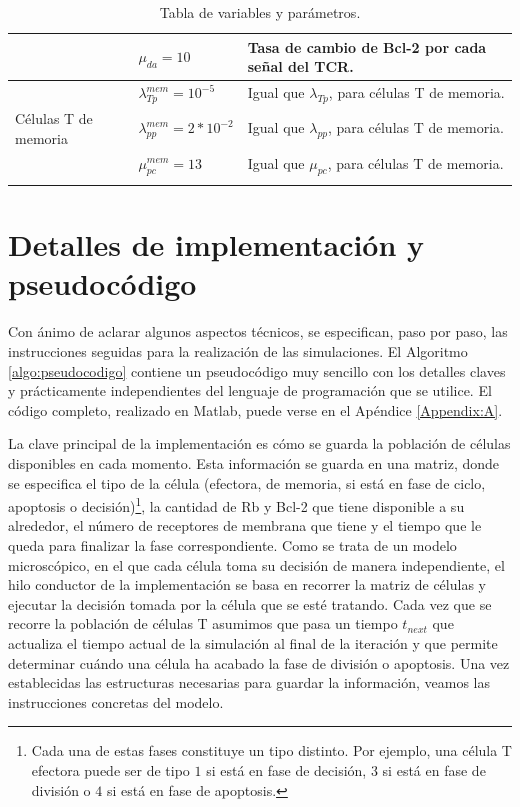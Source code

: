 \begin{table}[h]
\begin{center}
\begin{tabular}{>{\centering\arraybackslash}m{2cm} >{\arraybackslash}m{3cm} >{\arraybackslash}m{7cm} }
			& $\mu_{da} = 10$                 & Tasa de cambio de Bcl-2 por cada señal del TCR.           \\ \hline
			\multirow{4}{*}{} & $\lambda_{Tp}^{mem} = 10^{-5}$   & Igual que $\lambda_{Tp}$, para células T de memoria.      \\ \cline{2-3}
			Células T de memoria        & $\lambda_{pp}^{mem} = 2*10^{-2}$ & Igual que $\lambda_{pp}$, para células T de memoria.      \\ \cline{2-3}
			& $\mu_{pc}^{mem} = 13$           & Igual que $\mu_{pc}$, para células T de memoria.          \\ \cline{2-3}\hline
		\end{tabular}
		\caption{Tabla de variables y parámetros.}
		\label{tabla:param}
	\end{center}
\end{table}


\section{Detalles de implementación y pseudocódigo}
\label{sec:implem_pseudo}

Con ánimo de aclarar algunos aspectos técnicos, se especifican, paso por paso, las instrucciones seguidas para la realización de las simulaciones. El Algoritmo \ref{algo:pseudocodigo} contiene un pseudocódigo muy sencillo con los detalles claves y prácticamente independientes del lenguaje de programación que se utilice. El código completo, realizado en Matlab, puede verse en el Apéndice \ref{Appendix:A}.

La clave principal de la implementación es cómo se guarda la población de células disponibles en cada momento. Esta información se guarda en una matriz, donde se especifica el tipo de la célula (efectora, de memoria, si está en fase de ciclo, apoptosis o decisión)\footnote{Cada una de estas fases constituye un tipo distinto. Por ejemplo, una célula T efectora puede ser de tipo $1$ si está en fase de decisión, $3$ si está en fase de división o $4$ si está en fase de apoptosis.}, la cantidad de Rb y Bcl-2 que tiene disponible a su alrededor, el número de receptores de membrana que tiene y el tiempo que le queda para finalizar la fase correspondiente. Como se trata de un modelo microscópico, en el que cada célula toma su decisión de manera independiente, el hilo conductor de la implementación se basa en recorrer la matriz de células y ejecutar la decisión tomada por la célula que se esté tratando. Cada vez que se recorre la población de células T asumimos que pasa un tiempo $t_{next}$ que actualiza el tiempo actual de la simulación al final de la iteración y que permite determinar cuándo una célula ha acabado la fase de división o apoptosis. Una vez establecidas las estructuras necesarias para guardar la información, veamos las instrucciones concretas del modelo.


